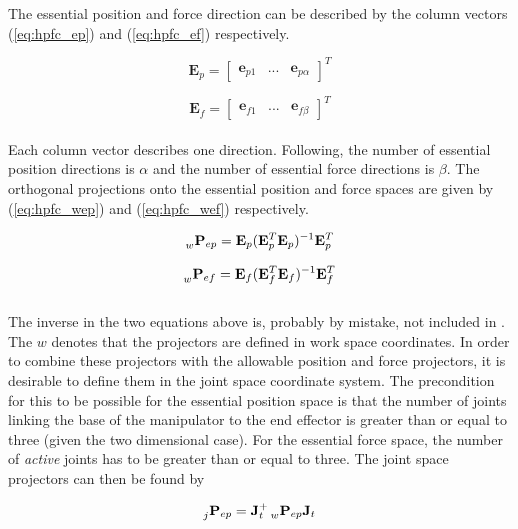 The essential position and force direction can be described by the column vectors (\ref{eq:hpfc_ep}) and (\ref{eq:hpfc_ef}) respectively.

\begin{equation}\label{eq:hpfc_ep}
    \mathbf{E}_p =
    \begin{bmatrix}
        \mathbf{e}_{p1} & ... & \mathbf{e}_{p\alpha}
    \end{bmatrix}^T
\end{equation}

\begin{equation}\label{eq:hpfc_ef}
    \mathbf{E}_f =
    \begin{bmatrix}
        \mathbf{e}_{f1} & ... & \mathbf{e}_{f\beta}
    \end{bmatrix}^T
\end{equation}
\\
Each column vector describes one direction. Following, the number of essential position directions is $\alpha$ and the number of essential force directions is $\beta$. The orthogonal projections onto the essential position and force spaces are given by (\ref{eq:hpfc_wep}) and (\ref{eq:hpfc_wef}) respectively.

\begin{equation}\label{eq:hpfc_wep}
    \prescript{}{w}{\mathbf{P}}_{ep} = \mathbf{E}_p(\mathbf{E}_p^T \mathbf{E}_p)^{-1} \mathbf{E}_p^T
\end{equation}

\begin{equation}\label{eq:hpfc_wef}
    \prescript{}{w}{\mathbf{P}}_{ef} = \mathbf{E}_f(\mathbf{E}_f^T \mathbf{E}_f)^{-1} \mathbf{E}_f^T
\end{equation}
\\
The inverse in the two equations above is, probably by mistake, not included in \cite{west1985method}. The $w$ denotes that the projectors are defined in work space coordinates. In order to combine these projectors with the allowable position and force projectors, it is desirable to define them in the joint space coordinate system. The precondition for this to be possible for the essential position space is that the number of joints linking the base of the manipulator to the end effector is greater than or equal to three (given the two dimensional case). For the essential force space, the number of \textit{active} joints has to be greater than or equal to three. The joint space projectors can then be found by

\begin{equation}\label{eq:hpfc_jep}
    \prescript{}{j}{\mathbf{P}}_{ep} = \mathbf{J}_t^+ \prescript{}{w}{\mathbf{P}}_{ep} \mathbf{J}_t
\end{equation}

